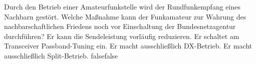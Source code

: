     {Durch den Betrieb einer Amateurfunkstelle wird der Rundfunkempfang eines Nachbarn gestört. Welche Maßnahme kann der Funkamateur zur Wahrung des nachbarschaftlichen Friedens noch vor Einschaltung der Bundesnetzagentur durchführen?}
    {Er kann die Sendeleistung vorläufig reduzieren.}
    {Er schaltet am Transceiver Passband-Tuning ein.}
    {Er macht ausschließlich DX-Betrieb.}
    {Er macht ausschließlich Split-Betrieb. }
    {false}{false}